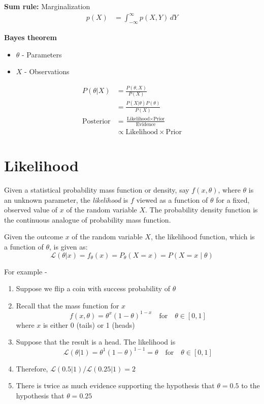 \documentclass{article}
\begin{document}
\noindent
\textbf{Sum rule:} Marginalization
\begin{align*}
p(X) &= \int _{-\infty }^{\infty} p(X,Y) \, dY
\end{align*} 

\noindent
\textbf{Bayes theorem}
\begin{itemize}
\item $\theta$ - Parameters
\item $X$ - Observations
\end{itemize}
\begin{align*} 
P(\theta \vert X) &= \frac{P(\theta, X)}{P(X)} \\
&= \frac{P(X \vert \theta)P(\theta)}{P(X)} \\
\text{Posterior} &= \frac{\text{Likelihood} \times \text{Prior}}{\text{Evidence}} \\
& \propto \text{Likelihood} \times \text{Prior}
\end{align*}

\section{Likelihood}
Given a statistical probability mass function or density, say $f(x,\theta)$, where $\theta$ is an unknown parameter, the \emph{likelihood} is $f$ viewed as a function of $\theta$ for a fixed, observed value of $x$ of the random variable $X$. The probability density function is the continuous analogue of probability mass function.

Given the outcome $x$ of the random variable $X$, the likelihood function, which is a function of $\theta$, is given as:
\begin{equation*}
\mathcal{L}(\theta|x) = f_{\theta}(x) = P_{\theta}(X = x) = P(X = x \mid \theta) 
\end{equation*} 

For example -
\begin{enumerate} \addtolength{\itemsep}{-0.5\baselineskip}
\item Suppose we flip a coin with success probability of $\theta$
\item Recall that the mass function for $x$
\[ f(x, \theta) = {\theta}^x{(1-\theta)^{1-x}} \quad \mbox{for} \quad \theta \in [0, 1]\] 
where $x$ is either 0 (tails) or 1 (heads)
\item Suppose that the result is a head. The likelihood is 
\[ \mathcal{L}(\theta|1) = {\theta}^1{(1-\theta)^{1-1}} = \theta \quad \mbox{for} \quad \theta \in [0, 1]\]
\item Therefore, $\mathcal{L}(0.5|1)/\mathcal{L}(0.25|1) = 2$
\item There is twice as much evidence supporting the hypothesis that $\theta = 0.5$ to the hypothesis that $\theta = 0.25$
\end{enumerate}
\end{document}

